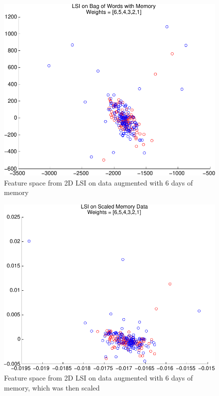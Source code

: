 \documentclass[10pt, twocolumn]{article}
\begin{document}
\begin{figure}
\centering
\includegraphics[scale=0.4]{plots/lsimem.pdf}
\caption{Feature space from 2D LSI on data augmented with 6 days of memory}
\label{lsimem}
\end{figure}

\begin{figure}
\centering
\includegraphics[scale=0.4]{plots/lsimemscaled.pdf}
\caption{Feature space from 2D LSI on data augmented with 6 days of memory, which was then scaled}
\label{lsimemscaled}
\end{figure}
\end{document}
